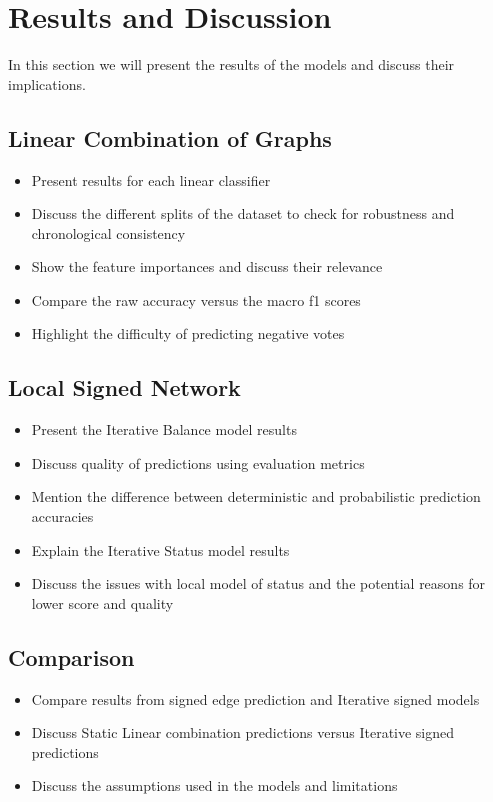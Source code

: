 \chapter{Results and Discussion} 
In this section we will present the results of the models and discuss their implications.
\section{Linear Combination of Graphs}
\begin{itemize}
    \item Present results for each linear classifier
    \item Discuss the different splits of the dataset to check for robustness and chronological consistency
    \item Show the feature importances and discuss their relevance 
    \item Compare the raw accuracy versus the macro f1 scores
    \item Highlight the difficulty of predicting negative votes
\end{itemize}
\section{Local Signed Network}
\begin{itemize}
    \item Present the Iterative Balance model results
    \item Discuss quality of predictions using evaluation metrics
    \item Mention the difference between deterministic and probabilistic prediction accuracies
    \item Explain the Iterative Status model results 
    \item Discuss the issues with local model of status and the potential reasons for lower score and quality
\end{itemize}
\section{Comparison}
\begin{itemize}
    \item Compare results from signed edge prediction and Iterative signed models
    \item Discuss Static Linear combination predictions versus Iterative signed predictions 
    \item Discuss the assumptions used in the models and limitations 
\end{itemize}

